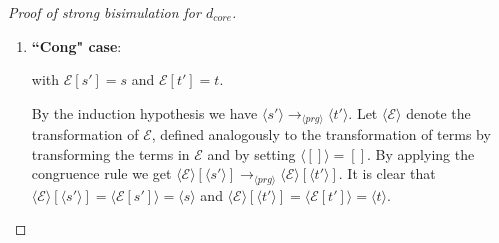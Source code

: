 \begin{proof}[Proof of strong bisimulation for $d_{core}$]
\begin{enumerate}
\begin{itemize}
For well-typedness, simply treat the missing types temporarily, that is, for the sake of (*), as codata types. This is no problem for the restriction to the domain of $d^{codata}$, since such types could be introduced inside the Codata Fragment with codata definitions. To be more precise, empty function definitions can be added for missing ones and empty codata definitions for missing types, and removed again after using (*), without adding or removing possible reductions, respectively. All in all, we have by (*):
\begin{equation*}
s \longrightarrow_{prg'} t \iff \langle s \rangle \longrightarrow_{\langle prg' \rangle^{d^{codata}}} \langle t \rangle
\end{equation*}

But this program $\langle prg' \rangle^{d^{codata}}$ is a subset of $\langle prg \rangle$, as can be seen in the definition of $d_{core}$. This implies the desired $\langle s \rangle \longrightarrow_{\langle prg \rangle} \langle t \rangle$.

\end{itemize}

Other cases are excluded by the relevant input fragment.

\item \textbf{``Cong" case}:

\begin{prooftree}
\end{prooftree}

with $\mathcal{E}[s'] = s$ and $\mathcal{E}[t'] = t$.

By the induction hypothesis we have $\langle s' \rangle \longrightarrow_{\langle prg \rangle} \langle t' \rangle$. Let $\langle \mathcal{E} \rangle$ denote the transformation of $\mathcal{E}$, defined analogously to the transformation of terms by transforming the terms in $\mathcal{E}$ and by setting $\langle [] \rangle = []$. By applying the congruence rule we get $\langle \mathcal{E} \rangle[\langle s' \rangle] \longrightarrow_{\langle prg \rangle} \langle \mathcal{E} \rangle[\langle t' \rangle]$. It is clear that $\langle \mathcal{E} \rangle[\langle s' \rangle] = \langle \mathcal{E}[s'] \rangle = \langle s \rangle$ and $\langle \mathcal{E} \rangle[\langle t' \rangle] = \langle \mathcal{E}[t'] \rangle = \langle t \rangle$.

\end{enumerate}


\end{proof}
